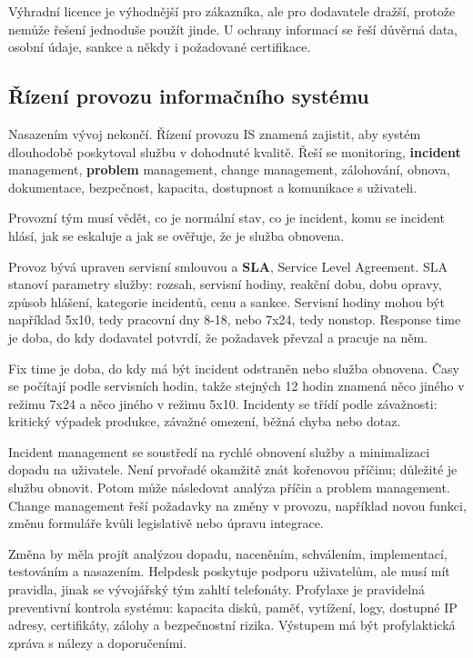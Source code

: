 Výhradní licence je výhodnější pro zákazníka, ale pro dodavatele dražší, protože nemůže řešení jednoduše použít jinde. U ochrany informací se řeší důvěrná data, osobní údaje, sankce a někdy i požadované certifikace.

\subsection*{Řízení provozu informačního systému}

Nasazením vývoj nekončí. Řízení provozu IS znamená zajistit, aby systém dlouhodobě poskytoval službu v dohodnuté kvalitě. Řeší se monitoring, \textbf{incident} management, \textbf{problem} management, change management, zálohování, obnova, dokumentace, bezpečnost, kapacita, dostupnost a komunikace s uživateli.

Provozní tým musí vědět, co je normální stav, co je incident, komu se incident hlásí, jak se eskaluje a jak se ověřuje, že je služba obnovena.

Provoz bývá upraven servisní smlouvou a \textbf{SLA}, Service Level Agreement. SLA stanoví parametry služby: rozsah, servisní hodiny, reakční dobu, dobu opravy, způsob hlášení, kategorie incidentů, cenu a sankce. Servisní hodiny mohou být například 5x10, tedy pracovní dny 8-18, nebo 7x24, tedy nonstop. Response time je doba, do kdy dodavatel potvrdí, že požadavek převzal a pracuje na něm.

Fix time je doba, do kdy má být incident odstraněn nebo služba obnovena. Časy se počítají podle servisních hodin, takže stejných 12 hodin znamená něco jiného v režimu 7x24 a něco jiného v režimu 5x10. Incidenty se třídí podle závažnosti: kritický výpadek produkce, závažné omezení, běžná chyba nebo dotaz.

Incident management se soustředí na rychlé obnovení služby a minimalizaci dopadu na uživatele. Není prvořadé okamžitě znát kořenovou příčinu; důležité je službu obnovit. Potom může následovat analýza příčin a problem management. Change management řeší požadavky na změny v provozu, například novou funkci, změnu formuláře kvůli legislativě nebo úpravu integrace.

Změna by měla projít analýzou dopadu, naceněním, schválením, implementací, testováním a nasazením. Helpdesk poskytuje podporu uživatelům, ale musí mít pravidla, jinak se vývojářský tým zahltí telefonáty. Profylaxe je pravidelná preventivní kontrola systému: kapacita disků, paměť, vytížení, logy, dostupné IP adresy, certifikáty, zálohy a bezpečnostní rizika. Výstupem má být profylaktická zpráva s nálezy a doporučeními.

